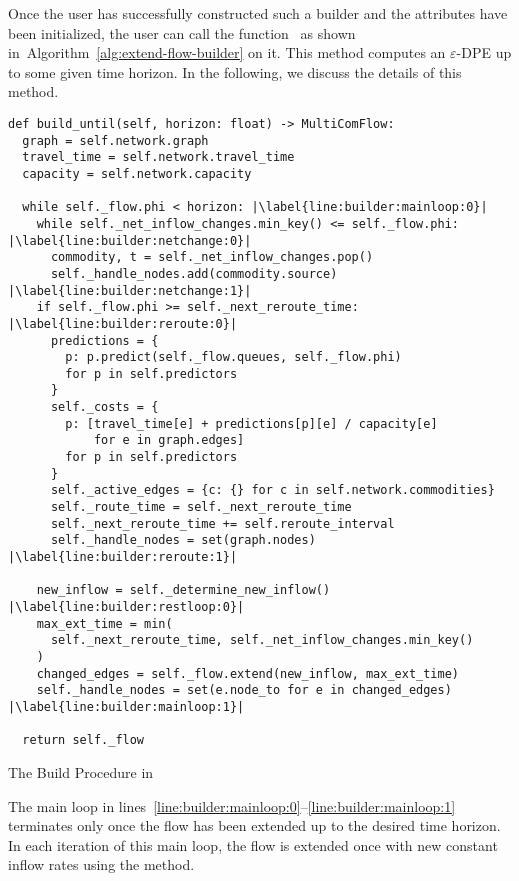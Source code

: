 Once the user has successfully constructed such a builder and the attributes have been initialized, the user can call the function~ as shown in~Algorithm~\ref{alg:extend-flow-builder} on it.
This method computes an $\varepsilon$-DPE up to some given time horizon.
In the following, we discuss the details of this method.
 
\begin{algorithm}
  \begin{verbatim}
def build_until(self, horizon: float) -> MultiComFlow:
  graph = self.network.graph
  travel_time = self.network.travel_time
  capacity = self.network.capacity

  while self._flow.phi < horizon: |\label{line:builder:mainloop:0}|
    while self._net_inflow_changes.min_key() <= self._flow.phi: |\label{line:builder:netchange:0}|
      commodity, t = self._net_inflow_changes.pop()
      self._handle_nodes.add(commodity.source) |\label{line:builder:netchange:1}|
    if self._flow.phi >= self._next_reroute_time: |\label{line:builder:reroute:0}|
      predictions = {
        p: p.predict(self._flow.queues, self._flow.phi)
        for p in self.predictors
      }
      self._costs = {
        p: [travel_time[e] + predictions[p][e] / capacity[e]
            for e in graph.edges]
        for p in self.predictors
      }
      self._active_edges = {c: {} for c in self.network.commodities}
      self._route_time = self._next_reroute_time
      self._next_reroute_time += self.reroute_interval
      self._handle_nodes = set(graph.nodes) |\label{line:builder:reroute:1}|

    new_inflow = self._determine_new_inflow() |\label{line:builder:restloop:0}|
    max_ext_time = min(
      self._next_reroute_time, self._net_inflow_changes.min_key()
    )
    changed_edges = self._flow.extend(new_inflow, max_ext_time)
    self._handle_nodes = set(e.node_to for e in changed_edges) |\label{line:builder:mainloop:1}|

  return self._flow
\end{verbatim}
\caption{The Build Procedure in }
\label{alg:extend-flow-builder}
\end{algorithm}

The main loop in lines~\ref{line:builder:mainloop:0}--\ref{line:builder:mainloop:1} 
terminates only once the flow has been extended up to the desired time horizon.
In each iteration of this main loop, the flow is extended once with new constant inflow rates using the  method.


